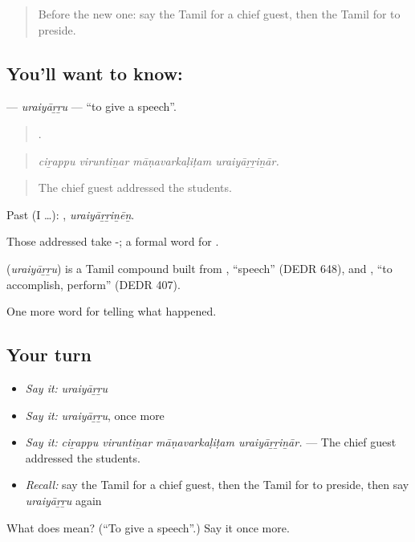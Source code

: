 \begin{quote}
Before the new one: say the Tamil for a chief guest, then the Tamil for to preside.
\end{quote}

\subsection*{You'll want to know: }
\textbf{} — \emph{uraiyāṟṟu} — \textquotedblleft{}to give a speech\textquotedblright{}.

\begin{quote}
   .
\end{quote}

\begin{quote}
\emph{ciṟappu viruntiṉar māṇavarkaḷiṭam uraiyāṟṟiṉār.}
\end{quote}

\begin{quote}
The chief guest addressed the students.
\end{quote}

Past (I …): , \emph{uraiyāṟṟiṉēṉ}.

Those addressed take -; a formal word for .

\begin{cousinweb}
\textbf{} (\emph{uraiyāṟṟu}) is a Tamil compound built from , \textquotedblleft{}speech\textquotedblright{} (DEDR 648), and , \textquotedblleft{}to accomplish, perform\textquotedblright{} (DEDR 407).
\end{cousinweb}

\begin{grammarlens}[title={What you've built}]
One more word for telling what happened.
\end{grammarlens}

\subsection*{Your turn}
\begin{itemize}
\raggedright
  \item \emph{Say it:} \emph{uraiyāṟṟu}
  \item \emph{Say it:} \emph{uraiyāṟṟu}, once more
  \item \emph{Say it:} \emph{ciṟappu viruntiṉar māṇavarkaḷiṭam uraiyāṟṟiṉār.} — The chief guest addressed the students.
  \item \emph{Recall:} say the Tamil for a chief guest, then the Tamil for to preside, then say \emph{uraiyāṟṟu} again
\end{itemize}

\begin{tcolorbox}[breakable,colback=teal!4,colframe=teal!35!black,title={Before you move on}]
What does  mean? (\textquotedblleft{}To give a speech\textquotedblright{}.) Say it once more.
\end{tcolorbox}

